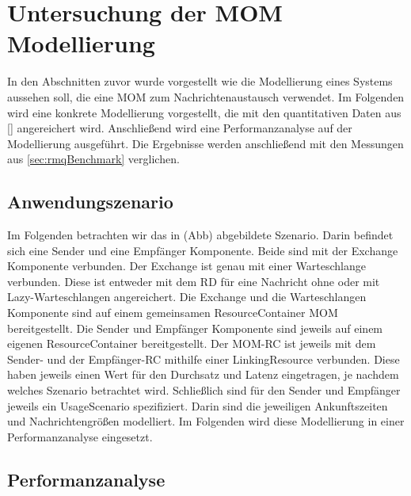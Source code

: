 

\section{Untersuchung der MOM Modellierung}
In den Abschnitten zuvor wurde vorgestellt wie die Modellierung eines Systems aussehen soll, die eine MOM zum Nachrichtenaustausch verwendet. Im Folgenden wird eine konkrete Modellierung vorgestellt, die mit den quantitativen Daten aus \autoref{} angereichert wird. Anschließend wird eine Performanzanalyse auf der Modellierung ausgeführt. Die Ergebnisse werden anschließend mit den Messungen aus \autoref{sec:rmqBenchmark} verglichen.

\subsection{Anwendungszenario}
Im Folgenden betrachten wir das in (Abb) abgebildete Szenario. Darin befindet sich eine Sender und eine Empfänger Komponente. Beide sind mit der Exchange Komponente verbunden. Der Exchange ist genau mit einer Warteschlange verbunden. Diese ist entweder mit dem RD für eine Nachricht ohne oder mit Lazy-Warteschlangen angereichert. Die Exchange und die Warteschlangen Komponente sind auf einem gemeinsamen ResourceContainer MOM bereitgestellt. Die Sender und Empfänger Komponente sind jeweils auf einem eigenen ResourceContainer bereitgestellt. Der MOM-RC ist jeweils mit dem Sender- und der Empfänger-RC mithilfe einer LinkingResource verbunden. Diese haben jeweils einen Wert für den Durchsatz und Latenz eingetragen, je nachdem welches Szenario betrachtet wird. Schließlich sind für den Sender und Empfänger jeweils ein UsageScenario spezifiziert. Darin sind die jeweiligen Ankunftszeiten und Nachrichtengrößen modelliert.
Im Folgenden wird diese Modellierung in einer Performanzanalyse eingesetzt.


\subsection{Performanzanalyse}
